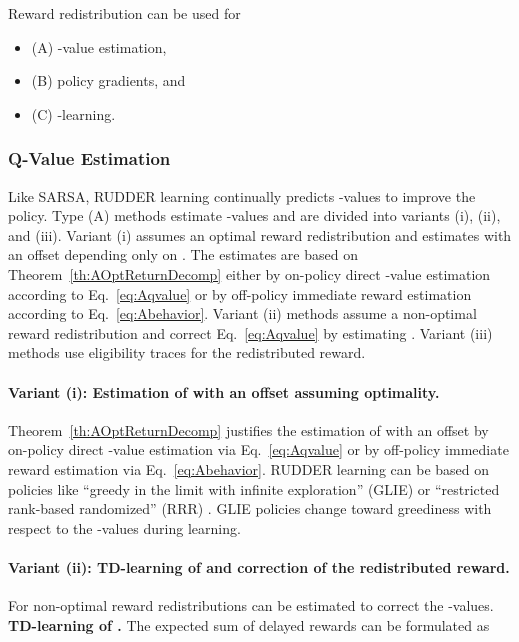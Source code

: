 \documentclass{article}
\begin{document}
\begin{appendices}
Reward redistribution can be used for
\begin{itemize}
\item
(A) -value estimation, 
\item
(B) policy gradients, and 
\item
(C) -learning.
\end{itemize}


\subsubsection{Q-Value Estimation}
\label{sec:QestimateA}
Like SARSA, RUDDER learning continually predicts 
-values to improve the policy. 
Type (A) methods estimate -values and are divided 
into variants (i), (ii), and (iii).
Variant (i) assumes an optimal reward redistribution
and estimates  with an offset
depending only on .
The estimates are based on Theorem~\ref{th:AOptReturnDecomp}
either by on-policy direct -value estimation according to Eq.~\eqref{eq:Aqvalue}
or by off-policy immediate reward estimation according to Eq.~\eqref{eq:Abehavior}.
Variant (ii) methods assume a non-optimal reward redistribution and 
correct Eq.~\eqref{eq:Aqvalue} by estimating .
Variant (iii) methods use eligibility traces for the redistributed reward.






\paragraph{Variant (i): Estimation of  
with an offset assuming optimality.}
Theorem~\ref{th:AOptReturnDecomp} justifies the estimation
of  with an offset
by on-policy direct -value estimation via Eq.~\eqref{eq:Aqvalue} or 
by off-policy immediate reward estimation via Eq.~\eqref{eq:Abehavior}.
RUDDER learning can be based on policies like
``greedy in the limit with infinite exploration'' (GLIE) or
``restricted rank-based randomized'' (RRR) \cite{Singh:00}. 
GLIE policies change toward greediness with respect to the -values
during learning.



\paragraph{Variant (ii): TD-learning of  and correction of the redistributed reward.}
For non-optimal reward redistributions  can be estimated 
to correct the -values.
{\bf TD-learning of .}
The expected sum of delayed rewards  can be formulated as
  

\end{appendices}
\end{document}
